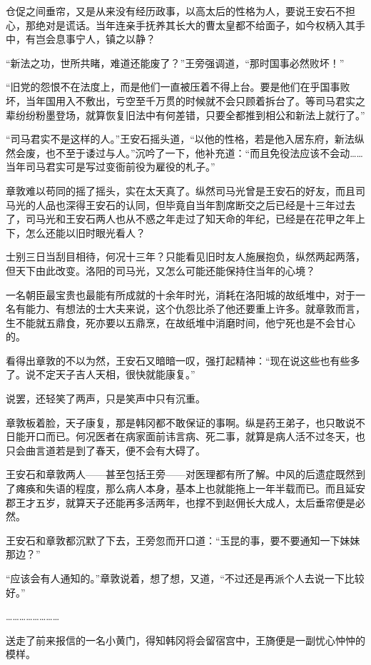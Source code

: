 仓促之间垂帘，又是从来没有经历政事，以高太后的性格为人，要说王安石不担心，那绝对是谎话。当年连亲手抚养其长大的曹太皇都不给面子，如今权柄入其手中，有岂会息事宁人，镇之以静？

“新法之功，世所共睹，难道还能废了？”王旁强调道，“那时国事必然败坏！”

“旧党的怨恨不在法度上，而是他们一直被压着不得上台。要是他们在乎国事败坏，当年国用入不敷出，亏空至千万贯的时候就不会只顾着拆台了。等司马君实之辈纷纷粉墨登场，就算恢复旧法中有何差错，只要全都推到相公和新法上就行了。”

“司马君实不是这样的人。”王安石摇头道，“以他的性格，若是他入居东府，新法纵然会废，也不至于诿过与人。”沉吟了一下，他补充道：“而且免役法应该不会动……当年司马君实可是写过变衙前役为雇役的札子。”

章敦难以苟同的摇了摇头，实在太天真了。纵然司马光曾是王安石的好友，而且司马光的人品也深得王安石的认同，但毕竟自当年割席断交之后已经是十三年过去了，司马光和王安石两人也从不惑之年走过了知天命的年纪，已经是在花甲之年上下，怎么还能以旧时眼光看人？

士别三日当刮目相待，何况十三年？只能看见旧时友人施展抱负，纵然两起两落，但天下由此改变。洛阳的司马光，又怎么可能还能保持住当年的心境？

一名朝臣最宝贵也最能有所成就的十余年时光，消耗在洛阳城的故纸堆中，对于一名有能力、有想法的士大夫来说，这个仇怨比杀了他还要重上许多。就章敦而言，生不能就五鼎食，死亦要以五鼎烹，在故纸堆中消磨时间，他宁死也是不会甘心的。

看得出章敦的不以为然，王安石又暗暗一叹，强打起精神：“现在说这些也有些多了。说不定天子吉人天相，很快就能康复。”

说罢，还轻笑了两声，只是笑声中只有沉重。

章敦板着脸，天子康复，那是韩冈都不敢保证的事啊。纵是药王弟子，也只敢说不日能开口而已。何况医者在病家面前讳言病、死二事，就算是病人活不过冬天，也只会曲言道若是到了春天，便不会有大碍了。

王安石和章敦两人——甚至包括王旁——对医理都有所了解。中风的后遗症既然到了瘫痪和失语的程度，那么病人本身，基本上也就能拖上一年半载而已。而且延安郡王才五岁，就算天子还能再多活两年，也撑不到赵佣长大成人，太后垂帘便是必然。

王安石和章敦都沉默了下去，王旁忽而开口道：“玉昆的事，要不要通知一下妹妹那边？”

“应该会有人通知的。”章敦说着，想了想，又道，“不过还是再派个人去说一下比较好。”

……………………

送走了前来报信的一名小黄门，得知韩冈将会留宿宫中，王旖便是一副忧心忡忡的模样。

